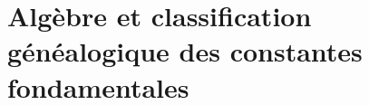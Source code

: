\chapter{Algèbre et classification généalogique des constantes fondamentales}
\label{chap:p3-final:27:algebra_clasificacion}



